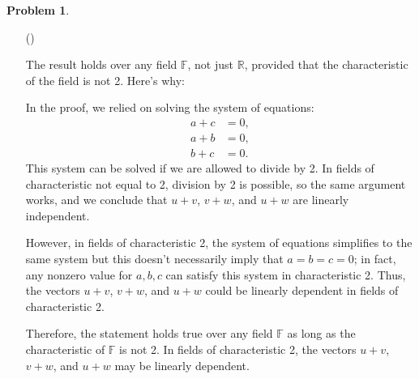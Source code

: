 \documentclass[12pt]{article}
\theoremstyle{definition}
\newtheorem{problem}{Problem}
\newcounter{subq}[problem]
\newenvironment{subproblem}
{\refstepcounter{subq} \begin{itemize} \item[(\alph{subq})]}
{\end{itemize} \medskip}
\begin{document}
\begin{problem}
\begin{subproblem}
        \begin{solution}
            The result holds over any field \( \mathbb{F} \), not just \( \mathbb{R} \), provided that the characteristic of the field is not 2. Here’s why:

            In the proof, we relied on solving the system of equations:
            \[
            \begin{aligned}
                a + c &= 0, \\
                a + b &= 0, \\
                b + c &= 0.
            \end{aligned}
            \]
            This system can be solved if we are allowed to divide by 2. In fields of characteristic not equal to 2, division by 2 is possible, so the same argument works, and we conclude that \( u + v \), \( v + w \), and \( u + w \) are linearly independent.

            However, in fields of characteristic 2, the system of equations simplifies to the same system but
            this doesn't necessarily imply that \( a = b = c = 0 \); in fact, any nonzero value for \( a, b, c \) can satisfy this system in characteristic 2. Thus, the vectors \( u + v \), \( v + w \), and \( u + w \) could be linearly dependent in fields of characteristic 2.

            Therefore, the statement holds true over any field \( \mathbb{F} \) as long as the characteristic of \( \mathbb{F} \) is not 2. In fields of characteristic 2, the vectors \( u + v \), \( v + w \), and \( u + w \) may be linearly dependent.
        \end{solution}
    \end{subproblem}
\end{problem}
\end{document}
